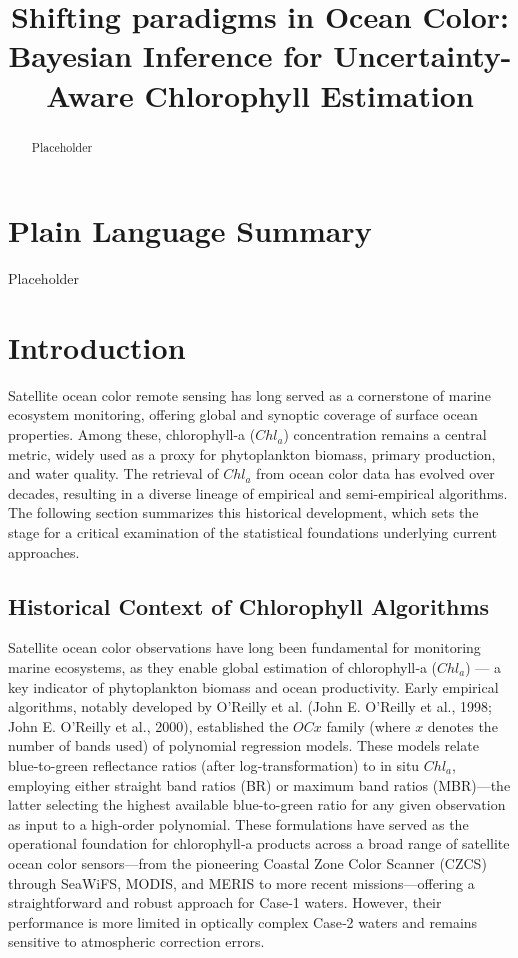 \documentclass[
]{agujournal2019}
\begin{document}
\title{Shifting paradigms in Ocean Color: Bayesian Inference for
Uncertainty-Aware Chlorophyll Estimation}



\begin{abstract}
Placeholder
\end{abstract}

\section*{Plain Language Summary}
Placeholder




\section{Introduction}\label{introduction}

Satellite ocean color remote sensing has long served as a cornerstone of
marine ecosystem monitoring, offering global and synoptic coverage of
surface ocean properties. Among these, chlorophyll-a (\(Chl_a\))
concentration remains a central metric, widely used as a proxy for
phytoplankton biomass, primary production, and water quality. The
retrieval of \(Chl_a\) from ocean color data has evolved over decades,
resulting in a diverse lineage of empirical and semi-empirical
algorithms. The following section summarizes this historical
development, which sets the stage for a critical examination of the
statistical foundations underlying current approaches.

\subsection{Historical Context of Chlorophyll
Algorithms}\label{historical-context-of-chlorophyll-algorithms}

Satellite ocean color observations have long been fundamental for
monitoring marine ecosystems, as they enable global estimation of
chlorophyll‑a (\(Chl_a\)) --- a key indicator of phytoplankton biomass
and ocean productivity. Early empirical algorithms, notably developed by
O'Reilly et al. (John E. O'Reilly et al., 1998; John E. O'Reilly et al.,
2000), established the \(OCx\) family (where \(x\) denotes the number of
bands used) of polynomial regression models. These models relate
blue-to-green reflectance ratios (after log‑transformation) to in situ
\(Chl_a\), employing either straight band ratios (BR) or maximum band
ratios (MBR)---the latter selecting the highest available blue-to-green
ratio for any given observation as input to a high‑order polynomial.
These formulations have served as the operational foundation for
chlorophyll‑a products across a broad range of satellite ocean color
sensors---from the pioneering Coastal Zone Color Scanner (CZCS) through
SeaWiFS, MODIS, and MERIS to more recent missions---offering a
straightforward and robust approach for Case‑1 waters. However, their
performance is more limited in optically complex Case‑2 waters and
remains sensitive to atmospheric correction errors.
\end{document}
